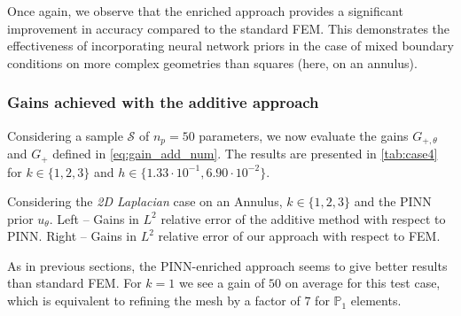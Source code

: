Once again, we observe that the enriched approach provides a significant improvement in accuracy compared to the standard FEM. This demonstrates the effectiveness of incorporating neural network priors in the case of mixed boundary conditions on more complex geometries than squares (here, on an annulus).

\subsubsection{Gains achieved with the additive approach} \label{par:Lap2DAnn_gains}

Considering a sample $\mathcal{S}$ of $n_p=50$ parameters,
we now evaluate the gains $G_{+,\theta}$ and $G_+$ defined in \eqref{eq:gain_add_num}.
The results are presented in \cref{tab:case4}
for $k \in \{1,2,3\}$ and $h \in \{1.33\cdot 10^{-1},6.90\cdot 10^{-2}\}$.

\begin{table}[H]
	\centering
	\caption{Considering the \textit{2D Laplacian} case on an Annulus, $k\in\{1,2,3\}$ and the PINN prior $u_\theta$. Left -- Gains in $L^2$ relative error of the additive method with respect to PINN. Right -- Gains in $L^2$ relative error of our approach with respect to FEM.}
	\label{tab:case4}
\end{table}

As in previous sections, the PINN-enriched approach seems to give better results than standard FEM. For $k=1$ we see a gain of $50$ on average for this test case, which is equivalent to refining the mesh by a factor of $7$ for $\mathbb{P}_1$ elements.
